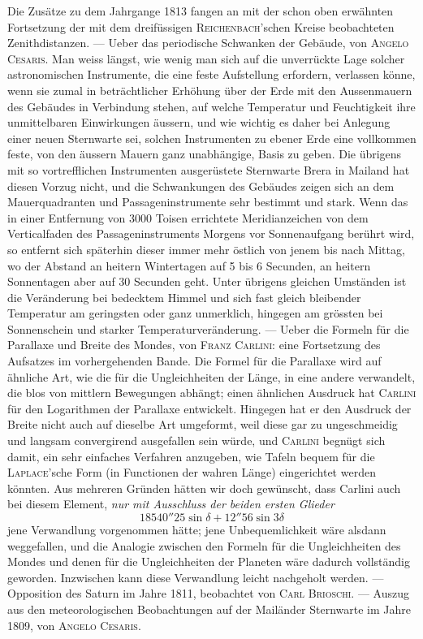 Die Zusätze zu dem Jahrgange 1813 fangen an mit der schon oben erwähnten Fortsetzung der mit dem dreifüssigen \textsc{Reichenbach}'schen Kreise beobachteten Zenithdistanzen. --- Ueber das periodische Schwanken der Gebäude, von \textsc{Angelo Cesaris}. Man weiss längst, wie wenig man sich auf die unverrückte Lage solcher astronomischen Instrumente, die eine feste Aufstellung erfordern, verlassen könne, wenn sie zumal in beträchtlicher Erhöhung über der Erde mit den Aussenmauern des Gebäudes in Verbindung stehen, auf welche Temperatur und Feuchtigkeit ihre unmittelbaren Einwirkungen äussern, und wie wichtig es daher bei Anlegung einer neuen Sternwarte sei, solchen Instrumenten zu ebener Erde eine vollkommen feste, von den äussern Mauern ganz unabhängige, Basis zu geben. Die übrigens mit so vortrefflichen Instrumenten ausgerüstete Sternwarte Brera in Mailand hat diesen Vorzug nicht, und die Schwankungen des Gebäudes zeigen sich an dem Mauerquadranten und Passageninstrumente sehr bestimmt und stark. Wenn das in einer Entfernung von 3000 Toisen errichtete Meridianzeichen von dem Verticalfaden des Passageninstruments Morgens vor Sonnenaufgang berührt wird, so entfernt sich späterhin dieser immer mehr östlich von jenem bis nach Mittag, wo der Abstand an heitern Wintertagen auf 5 bis 6 Secunden, an heitern Sonnentagen aber auf 30 Secunden geht. Unter übrigens gleichen Umständen ist die Veränderung bei bedecktem Himmel und sich fast gleich bleibender Temperatur am geringsten oder ganz unmerklich, hingegen am grössten bei Sonnenschein und starker Temperaturveränderung. --- Ueber die Formeln für die Parallaxe und Breite des Mondes, von \textsc{Franz Carlini}: eine Fortsetzung des Aufsatzes im vorhergehenden Bande. Die Formel für die Parallaxe wird auf ähnliche Art, wie die für die Ungleichheiten der Länge, in eine andere verwandelt, die blos von mittlern Bewegungen abhängt; einen ähnlichen Ausdruck hat \textsc{Carlini} für den Logarithmen der Parallaxe entwickelt. Hingegen hat er den Ausdruck der Breite nicht auch auf dieselbe Art umgeformt, weil diese gar zu ungeschmeidig und langsam convergirend ausgefallen sein würde, und \textsc{Carlini} begnügt sich damit, ein sehr einfaches Verfahren anzugeben, wie Tafeln bequem für die \textsc{Laplace}'sche Form (in Functionen der wahren Länge) eingerichtet werden könnten. Aus mehreren Gründen hätten wir doch gewünscht, dass Carlini auch bei diesem Element, \emph{nur mit Ausschluss der beiden ersten Glieder} 
\[
18540''25\sin\delta + 12''56\sin 3\delta
\]
jene Verwandlung vorgenommen hätte; jene Unbequemlichkeit wäre alsdann weggefallen, und die Analogie zwischen den Formeln für die Ungleichheiten des Mondes und denen für die Ungleichheiten der Planeten wäre dadurch vollständig geworden. Inzwischen kann diese Verwandlung leicht nachgeholt werden. --- Opposition des Saturn im Jahre 1811, beobachtet von \textsc{Carl Brioschi}. --- Auszug aus den meteorologischen Beobachtungen auf der Mailänder Sternwarte im Jahre 1809, von \textsc{Angelo Cesaris}.
